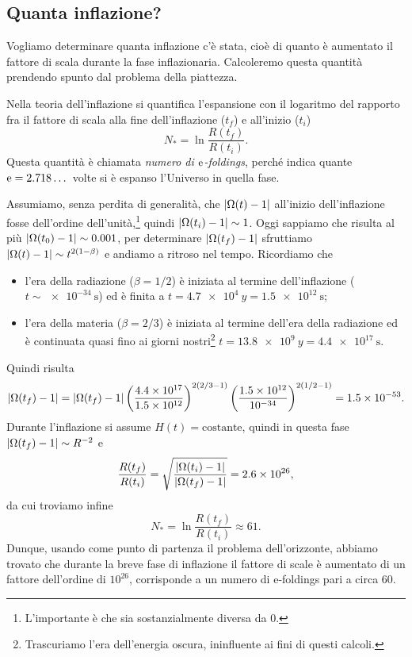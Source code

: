 \subsection{Quanta inflazione?}
\label{sec:quanta-inflazione}

Vogliamo determinare quanta inflazione c'è stata, cioè di quanto è aumentato il
fattore di scala durante la fase inflazionaria.  Calcoleremo questa quantità
prendendo spunto dal problema della piattezza.

Nella teoria dell'inflazione si quantifica l'espansione con il logaritmo del
rapporto fra il fattore di scala alla fine dell'inflazione (\(t_{f}\)) e
all'inizio (\(t_{i}\))
\begin{equation}
  N_{*} = \ln \frac{R(t_{f})}{R(t_{i})}.
\end{equation}
Questa quantità è chiamata \emph{numero di \(\operatorname{\mathrm{e}}\)-foldings}, perché indica
quante \(\operatorname{\mathrm{e}} = 2.718\dots\) volte si è espanso l'Universo in quella fase.

Assumiamo, senza perdita di generalità, che \(\lvert\Omega(t) - 1\rvert\) all'inizio
dell'inflazione fosse dell'ordine dell'unità,\footnote{L'importante è che sia
  sostanzialmente diversa da \(0\).} quindi \(\lvert\Omega(t_{i}) - 1\rvert \sim 1\).
Oggi sappiamo che risulta al più \(\lvert\Omega(t_{0}) - 1\rvert \sim 0.001\), per
determinare \(\lvert\Omega(t_{f}) - 1\rvert\) sfruttiamo \(\lvert\Omega(t) -1\rvert \sim
t^{2(1-\beta)}\) e andiamo a ritroso nel tempo.  Ricordiamo che
\begin{itemize}
\item l'era della radiazione (\(\beta = 1/2\)) è iniziata al termine
  dell'inflazione (\(t \sim \SI{e-34}{\second}\)) ed è finita a \(t =
  \SI{4.7e4}{y} = \SI{1.5e12}{\second}\);
\item l'era della materia (\(\beta = 2/3\)) è iniziata al termine dell'era della
  radiazione ed è continuata quasi fino ai giorni nostri\footnote{Trascuriamo
    l'era dell'energia oscura, ininfluente ai fini di questi calcoli.} \(t =
  \SI{13.8e9}{y} = \SI{4.4e17}{\second}\).
\end{itemize}
Quindi risulta
\begin{equation}
  \lvert\Omega(t_{f}) - 1\rvert = \lvert\Omega(t_{f}) - 1\rvert
  \left(\frac{\num{4.4e17}}{\num{1.5e12}}\right)^{2(2/3-1)}
  \left(\frac{\num{1.5e12}}{\num{e-34}}\right)^{2(1/2-1)} = \num{1.5e-53}.
\end{equation}
Durante l'inflazione si assume \(H(t) = \text{costante}\), quindi in questa fase
\(\lvert\Omega(t_{f}) - 1\rvert \sim R^{-2}\) e
\begin{equation}
  \frac{R(t_{f})}{R(t_{i})} = \sqrt{\frac{\lvert\Omega(t_{i}) -
        1\rvert}{\lvert\Omega(t_{f}) - 1\rvert}} = \num{2.6e26},
\end{equation}
da cui troviamo infine
\begin{equation}
  N_{*} = \ln \frac{R(t_{f})}{R(t_{i})} \approx 61.
\end{equation}
Dunque, usando come punto di partenza il problema dell'orizzonte, abbiamo
trovato che durante la breve fase di inflazione il fattore di scale è aumentato
di un fattore dell'ordine di \(10^{26}\), corrisponde a un numero di e-foldings
pari a circa \(60\).

